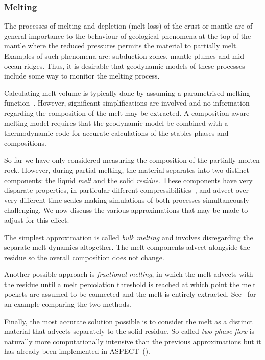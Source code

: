 \subsubsection{Melting}

The processes of melting and depletion (melt loss) of the crust or mantle are of general importance to the behaviour of geological phenomena at the top of the mantle where the reduced pressures permits the material to partially melt. 
Examples of such phenomena are: subduction zones, mantle plumes and mid-ocean ridges. 
Thus, it is desirable that geodynamic models of these processes include some way to monitor the melting process.

Calculating melt volume is typically done by assuming a parametrised melting function~\parencite[e.g.][]{dannbergCompressibleMagmaMantle2016}.
However, significant simplifications are involved and no information regarding the composition of the melt may be extracted.
A composition-aware melting model requires that the geodynamic model be combined with a thermodynamic code for accurate calculations of the stables phases and compositions.

So far we have only considered measuring the composition of the partially molten rock.
However, during partial melting, the material separates into two distinct components: the liquid \textit{melt} and the solid \textit{residue}.
These components have very disparate properties, in particular different compressibilities~\parencite{dannbergCompressibleMagmaMantle2016}, and advect over very different time scales making simulations of both processes simultaneously challenging.
We now discuss the various approximations that may be made to adjust for this effect.

The simplest approximation is called \textit{bulk melting} and involves disregarding the separate melt dynamics altogether.
The melt components advect alongside the residue so the overall composition does not change.

Another possible approach is \textit{fractional melting}, in which the melt advects with the residue until a melt percolation threshold is reached at which point the melt pockets are assumed to be connected and the melt is entirely extracted. See~\cite{kaislaniemiLithosphereDestabilizationMelt2018} for an example comparing the two methods.

Finally, the most accurate solution possible is to consider the melt as a distinct material that advects separately to the solid residue.
So called \textit{two-phase flow} is naturally more computationally intensive than the previous approximations but it has already been implemented in ASPECT~(\cite{dannbergCompressibleMagmaMantle2016}).

